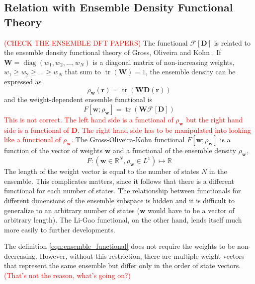 \documentclass[journal=jacsat,manuscript=article]{achemso}
\DeclareMathOperator{\tr}{tr}
\DeclareMathOperator{\Diag}{diag}
\newcommand\m[1]{\mathbf{#1}}
\renewcommand\vec[1]{\mathbf{#1}}
\begin{document}
\subsection{Relation with Ensemble Density Functional Theory}
\textcolor{red}{(CHECK THE ENSEMBLE DFT PAPERS)}
The functional $\mathcal{F}[\m{D}]$ is related to the ensemble density functional theory of
Gross, Oliveira and Kohn \cite{Gross1988ReyleighRitz,Gross1988EnsembleDFT}.
If $\m{W} = \Diag(w_1,w_2,\ldots,w_N)$ is a diagonal matrix of non-increasing weights, $w_1 \ge w_2 \ge \ldots \ge w_N$
that sum to $\tr(\m{W}) = 1$, the ensemble density can be expressed as
\begin{equation}
 \rho_{\vec{w}}(\vec{r}) = \tr(\m{W} \m{D}(\vec{r}))
\end{equation}
and the weight-dependent ensemble functional is
\begin{equation}
F[\vec{w}; \rho_{\vec{w}}] = \tr(\m{W} \mathcal{F}[\m{D}]) \label{eqn:ensemble_functional}
\end{equation}
\textcolor{red}{This is not correct. The left hand side is a functional of $\rho_{\vec{w}}$ but the right hand side is
a functional of $\m{D}$. The right hand side has to be manipulated into looking like a functional of $\rho_{\vec{w}}$.}
The Gross-Oliveira-Kohn functional $F[\vec{w};\rho_{\vec{w}}]$ is a function of the vector of weights $\vec{w}$
and a functional of the ensemble density $\rho_{\vec{w}}$,
\begin{equation}
 F : (\vec{w} \in \mathbb{R}^{N}, \rho_{\vec{w}} \in L^1) \mapsto \mathbb{R}
\end{equation}
The length of the weight vector is equal to the number of states $N$ in the ensemble.
This complicates matters, since it follows that there is a different functional for each number of states.
The relationship between functionals for different dimensions of the ensemble subspace is hidden
and it is difficult to generalize to an arbitrary number of states
($\vec{w}$ would have to be a vector of arbitrary length).
The Li-Gao functional, on the other hand, lends itself much more easily to further developments.

The definition \ref{eqn:ensemble_functional} does not require the weights to be non-decreasing.
However, without this restriction, there are multiple weight vectors that
represent the same ensemble but differ only in the order of state vectors.
\textcolor{red}{(That's not the reason, what's going on?)}
\fi
\end{document}
